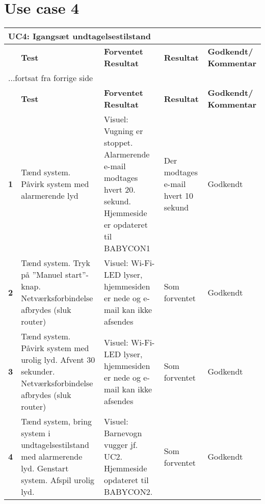 \section*{Use case 4}

\begin{center}
	\label{accepttest:uc4} 
\begin{longtable}{|p{}|p{}|p{}|p{}|p{}|} %
\hline
\multicolumn{5}{|l|}{\textbf{UC4: Igangsæt undtagelsestilstand}} \\ \hline
\multicolumn{1}{|c|}{} &
\textbf{Test} &
\textbf{Forventet \newline Resultat} &
\textbf{Resultat} &
\textbf{Godkendt/ \newline Kommentar} \\ \hline 
\endfirsthead

\multicolumn{5}{l}{...fortsat fra forrige side} \\ \hline 
\multicolumn{1}{|c|}{} &
\textbf{Test} &
\textbf{Forventet \newline Resultat} &
\textbf{Resultat} &
\textbf{Godkendt/ \newline Kommentar} \\ \hline 
\endhead



\textbf{1}	&Tænd system. Påvirk system med alarmerende lyd
			&Visuel: Vugning er stoppet. Alarmerende e-mail 
			 modtages hvert 20. sekund. Hjemmeside er 
			 opdateret til BABYCON1
			&Der modtages e-mail hvert 10 sekund
			&Godkendt
			\\\hline
			
\textbf{2}  &Tænd system. Tryk på ''Manuel start''-knap. 
			 Netværksforbindelse afbrydes (sluk router)
			&Visuel: Wi-Fi-LED lyser, hjemmesiden er nede og e-mail kan ikke afsendes
			&Som forventet
			&Godkendt
			\\\hline	
			
\textbf{3}  &Tænd system. Påvirk system med urolig lyd. 
			 Afvent 30 sekunder. Netværksforbindelse afbrydes (sluk router)
			&Visuel: Wi-Fi-LED lyser, hjemmesiden er nede og e-mail kan ikke afsendes
			&Som forventet
			&Godkendt
			\\\hline	

\textbf{4}	&Tænd system, bring system i undtagelsestilstand
			 med alarmerende lyd. Genstart system. Afspil urolig
			 lyd.
			&Visuel: Barnevogn vugger jf. UC2. Hjemmeside 
			 opdateret til BABYCON2.
			&Som forventet
			&Godkendt
			\\\hline
			
\end{longtable}
\end{center}